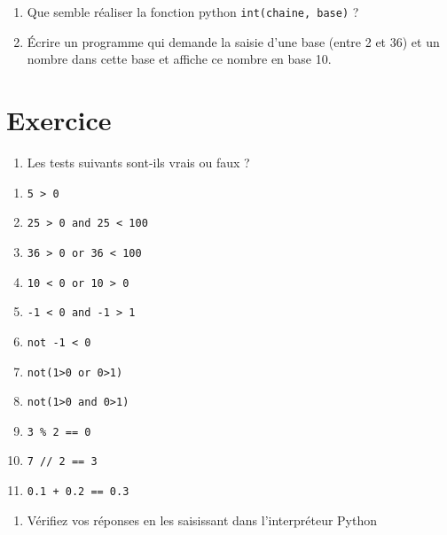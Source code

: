 \documentclass[11pt]{article}
\providecommand{\tightlist}{%
      \setlength{\itemsep}{0pt}\setlength{\parskip}{0pt}}
\begin{document}
\begin{enumerate}
\def\labelenumi{\arabic{enumi}.}
\setcounter{enumi}{1}
\tightlist
\item
  Que semble réaliser la fonction python \texttt{int(chaine,\ base)} ?
\item
  Écrire un programme qui demande la saisie d'une base (entre 2 et 36)
  et un nombre dans cette base et affiche ce nombre en base 10.
\end{enumerate}

    \hypertarget{exercice}{%
\section{Exercice}\label{exercice}}

\begin{enumerate}
\def\labelenumi{\arabic{enumi}.}
\tightlist
\item
  Les tests suivants sont-ils vrais ou faux ?
\end{enumerate}

\begin{enumerate}
\def\labelenumi{\alph{enumi})}

\item
  \texttt{5\ \textgreater{}\ 0}
\item
  \texttt{25\ \textgreater{}\ 0\ and\ 25\ \textless{}\ 100}
\item
  \texttt{36\ \textgreater{}\ 0\ or\ 36\ \textless{}\ 100}
\item
  \texttt{10\ \textless{}\ 0\ or\ 10\ \textgreater{}\ 0}
\item
  \texttt{-1\ \textless{}\ 0\ and\ -1\ \textgreater{}\ 1}
\item
  \texttt{not\ -1\ \textless{}\ 0}
\item
  \texttt{not(1\textgreater{}0\ or\ 0\textgreater{}1)}
\item
  \texttt{not(1\textgreater{}0\ and\ 0\textgreater{}1)}
\item
  \texttt{3\ \%\ 2\ ==\ 0}
\item
  \texttt{7\ //\ 2\ ==\ 3}
\item
  \texttt{0.1\ +\ 0.2\ ==\ 0.3}
\end{enumerate}

\begin{enumerate}
\def\labelenumi{\arabic{enumi}.}
\setcounter{enumi}{1}
\tightlist
\item
  Vérifiez vos réponses en les saisissant dans l'interpréteur Python
\end{enumerate}
\end{document}
